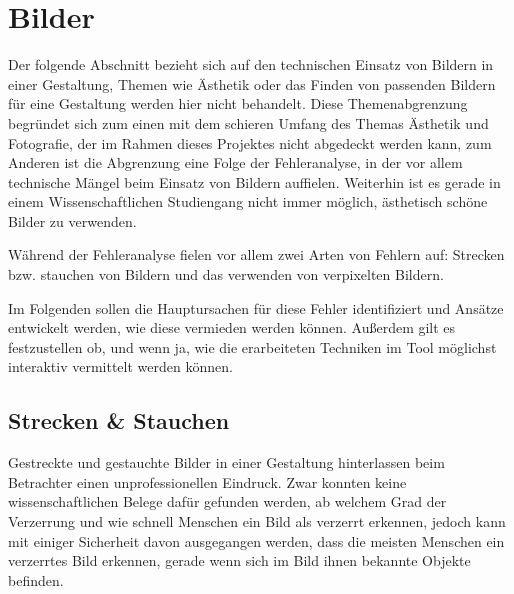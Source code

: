 
\chapter{Bilder} %

\label{Bilder} %



Der folgende Abschnitt bezieht sich auf den technischen Einsatz von Bildern in einer Gestaltung, Themen wie Ästhetik oder das Finden von passenden Bildern für eine Gestaltung werden hier nicht behandelt.
Diese Themenabgrenzung begründet sich zum einen mit dem schieren Umfang des Themas Ästhetik und Fotografie, der im Rahmen dieses Projektes nicht abgedeckt werden kann, zum Anderen ist die Abgrenzung eine Folge der Fehleranalyse, in der vor allem technische Mängel beim Einsatz von Bildern auffielen. Weiterhin ist es gerade in einem Wissenschaftlichen Studiengang nicht immer möglich, ästhetisch schöne Bilder zu verwenden.

Während der Fehleranalyse fielen vor allem zwei Arten von Fehlern auf: Strecken bzw. stauchen von Bildern und das verwenden von verpixelten Bildern.

Im Folgenden sollen die Hauptursachen für diese Fehler identifiziert und Ansätze entwickelt werden, wie diese vermieden werden können. Außerdem gilt es festzustellen ob, und wenn ja, wie die erarbeiteten Techniken im Tool möglichst interaktiv vermittelt werden können.

\section{Strecken \& Stauchen}
Gestreckte und gestauchte Bilder in einer Gestaltung hinterlassen beim Betrachter einen unprofessionellen Eindruck.
Zwar konnten keine wissenschaftlichen Belege dafür gefunden werden, ab welchem Grad der Verzerrung und wie schnell Menschen ein Bild als verzerrt erkennen, jedoch kann mit einiger Sicherheit davon ausgegangen werden, dass die meisten Menschen ein verzerrtes Bild erkennen, gerade wenn sich im Bild ihnen bekannte Objekte befinden.

